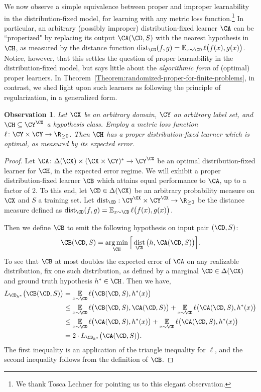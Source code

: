 \documentclass[11pt]{article}
\newtheorem{observation}[theorem]{\textbf{Observation}}
\begin{document}
We now observe a simple equivalence between proper and improper learnability in the distribution-fixed model, for learning with any metric loss function.\footnote{We thank Tosca Lechner for pointing us to this elegant observation.} In particular, an arbitrary (possibly improper) distribution-fixed learner $\CA$ can be ``properized" by replacing its output $\CA(\CD, S)$ with the nearest hypothesis in $\CH$, as measured by the distance function $\dist_{\CD}(f, g) = \E_{x \sim \CD} \ell\big( f(x), g(x) \big)$. Notice, however, that this settles the question of proper learnability in the distribution-fixed model, but says little about the \emph{algorithmic form} of (optimal) proper learners. In Theorem~\ref{Theorem:randomized-proper-for-finite-problems}, in contrast, we shed light upon such learners as following the principle of regularization, in a generalized form.

\begin{observation}\label{Observation:proper-dist-fixed}
Let $\CX$ be an arbitrary domain, $\CY$ an arbitrary label set, and $\CH \subseteq \CY^\CX$ a hypothesis class. Employ a metric loss function $\ell \colon \CY \times \CY \to \R_{\geq 0}$. Then $\CH$ has a proper distribution-fixed learner which is optimal, as measured by its expected error. 
\end{observation}
\begin{proof}
Let $\CA\colon \Delta(\CX) \times (\CX \times \CY)^* \to \CY^\CX$ be an optimal distribution-fixed learner for $\CH$, in the expected error regime. We will exhibit a proper distribution-fixed learner $\CB$ which attains equal performance to $\CA$, up to a factor of 2. To this end, let $\CD \in \Delta(\CX)$ be an arbitrary probability measure on $\CX$ and $S$ a training set. Let $\dist_{\CD}: \CY^\CX \times \CY^\CX \to \R_{\geq 0}$ be the distance measure defined as $\dist_{\CD}(f, g) = \E_{x \sim \CD} \ell\big( f(x), g(x) \big)$. 

Then we define $\CB$ to emit the following hypothesis on input pair $(\CD, S)$: 
\[ \CB(\CD, S) = \argmin_{\CH} \Big[ \dist_\CD \big(h, \CA(\CD, S) \big) \Big].  \]
To see that $\CB$ at most doubles the expected error of $\CA$ on any realizable distribution, fix one such distribution, as defined by a marginal $\CD \in \Delta(\CX)$ and ground truth hypothesis $h^* \in \CH$. Then we have,
\begin{align*}
L_{\CD_{h^*}}\big(\CB(\CD, S)\big) &= \E_{x \sim \CD} \ell \big( \CB(\CD, S), h^*(x) \big) \\
&\leq \E_{x \sim \CD} \ell \big( \CB(\CD, S), \CA(\CD, S) \big) + \E_{x \sim \CD} \ell \big( \CA(\CD, S), h^*(x) \big) \\ 
&\leq \E_{x \sim \CD} \ell \big( \CA(\CD, S), h^*(x) \big) + \E_{x \sim \CD} \ell \big( \CA(\CD, S), h^*(x) \big) \\
&= 2 \cdot L_{\CD_{h^*}}\big(\CA(\CD, S)\big). 
\end{align*}
The first inequality is an application of the triangle inequality for $\ell$, and the second inequality follows from the definition of $\CB$. 
\end{proof}
\end{document}
